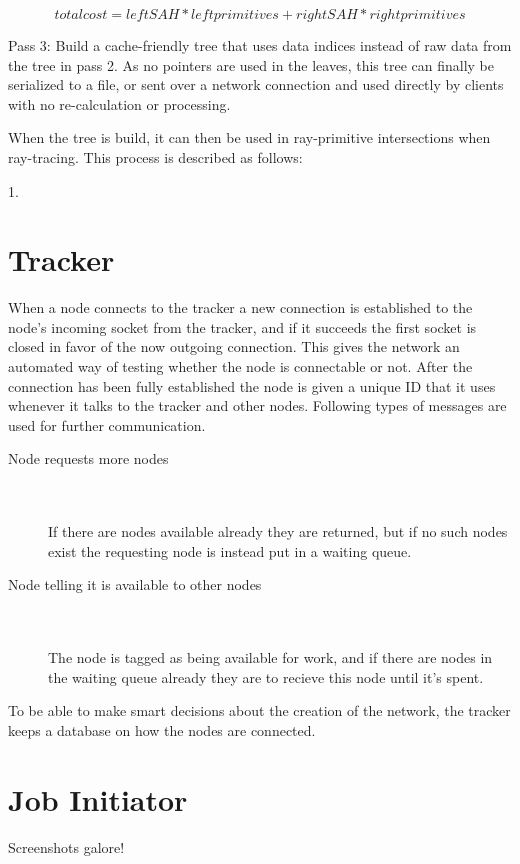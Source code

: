 \begin{equation}
total cost = left SAH * left primitives + right SAH * right primitives
\end{equation}

Pass 3: Build a cache-friendly tree that uses data indices instead of raw data from the tree in pass 2. As no pointers are used in the leaves, this tree can finally be serialized to a file, or sent over a network connection and used directly by clients with no re-calculation or processing.

When the tree is build, it can then be used in ray-primitive intersections when ray-tracing. This process is described as follows:

1. 

\section{Tracker}
When a node connects to the tracker a new connection is established to the node's incoming socket from the tracker, and if it succeeds the first socket is closed in favor of the now outgoing connection.
This gives the network an automated way of testing whether the node is connectable or not.
After the connection has been fully established the node is given a unique ID that it uses whenever it talks to the tracker and other nodes.
Following types of messages are used for further communication.

\begin{description}
\item[Node requests more nodes] \hfill \\\\
If there are nodes available already they are returned, but if no such nodes exist the requesting node is instead put in a waiting queue.
\item[Node telling it is available to other nodes] \hfill \\\\
The node is tagged as being available for work, and if there are nodes in the waiting queue already they are to recieve this node until it's spent.
\end{description}

To be able to make smart decisions about the creation of the network, the tracker keeps a database on how the nodes are connected.

\section{Job Initiator}
Screenshots galore!
